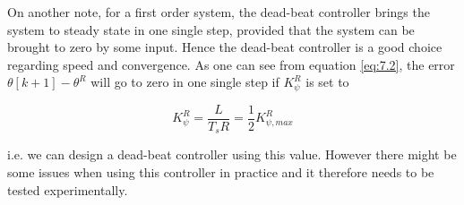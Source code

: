 On another note, for a first order system, the dead-beat controller brings the
system to steady state in one single step, provided that the system can be
brought to zero by some input. Hence the dead-beat controller is a good choice
regarding speed and convergence. As one can see from equation \ref{eq:7.2}, the
error $\theta[k+1] - \theta^R$ will go to zero in one single step if $K_\psi ^R$
is set to

\begin{equation*}
K_\psi ^R = \frac{L}{T_s R} = \frac{1}{2}K_{\psi,max}^R
\end{equation*}

i.e. we can design a dead-beat controller using this value. However there might
be some issues when using this controller in practice and it therefore needs to
be tested experimentally.
